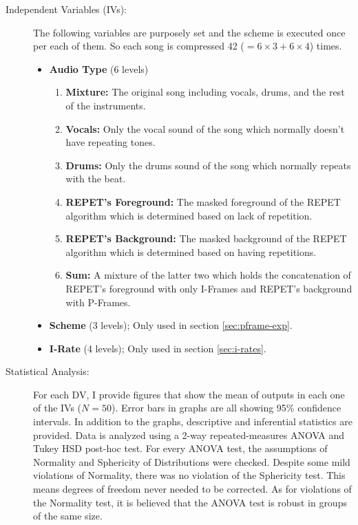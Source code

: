 \begin{description}
\item[Independent Variables (IVs):] The following variables are purposely set and the scheme is executed once per each of them. So each song is compressed 42 ($=6\times 3 + 6\times 4$) times.
\begin{itemize}[leftmargin=*]
\item\textbf{Audio Type} (6 levels)
\begin{enumerate}[nosep, leftmargin=*]
\item\textbf{Mixture:} The original song including vocals, drums, and the rest of the instruments.
\item\textbf{Vocals:} Only the vocal sound of the song which normally doesn't have repeating tones.
\item\textbf{Drums:} Only the drums sound of the song which normally repeats with the beat.
\item\textbf{REPET's Foreground:} The masked foreground of the REPET algorithm which is determined based on lack of repetition.
\item\textbf{REPET's Background:} The masked background of the REPET algorithm which is determined based on having repetitions.
\item\textbf{Sum:} A mixture of the latter two which holds the concatenation of REPET's foreground with only I-Frames and REPET's background with P-Frames.
\end{enumerate}
\item\textbf{Scheme} (3 levels); Only used in section \ref{sec:pframe-exp}.
\item\textbf{I-Rate} (4 levels); Only used in section \ref{sec:i-rates}.
\end{itemize}

\item[Statistical Analysis:] For each DV, I provide figures that show the mean of outputs in each one of the IVs ($N=50$). Error bars in graphs are all showing 95\% confidence intervals. In addition to the graphs, descriptive and inferential statistics are provided. Data is analyzed using a 2-way repeated-measures ANOVA and Tukey HSD post-hoc test. For every ANOVA test, the assumptions of Normality and Sphericity of Distributions were checked. Despite some mild violations of Normality, there was no violation of the Sphericity test. This means degrees of freedom never needed to be corrected. As for violations of the Normality test, it is believed that the ANOVA test is robust in groups of the same size.

\end{description}



